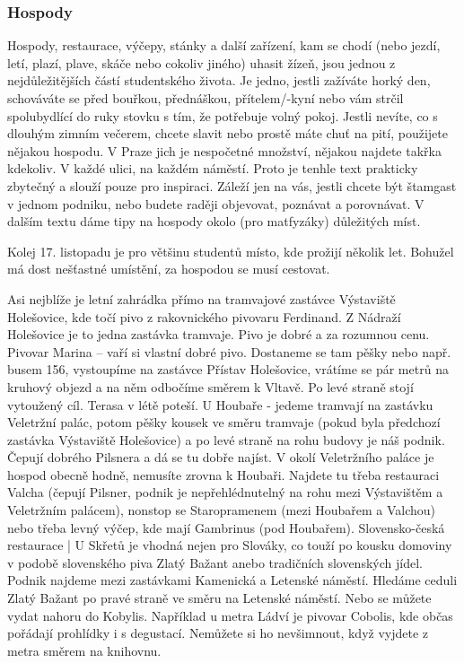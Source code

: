 \subsubsection{Hospody}
Hospody, restaurace, výčepy, stánky a další zařízení, kam se chodí (nebo jezdí, letí, plazí, plave, skáče nebo cokoliv jiného) uhasit žízeň, jsou jednou z nejdůležitějších částí studentského života. Je jedno, jestli zažíváte horký den, schováváte se před bouřkou, přednáškou, přítelem/-kyní nebo vám strčil spolubydlící do ruky stovku s tím, že potřebuje volný pokoj. Jestli nevíte, co s dlouhým zimním večerem, chcete slavit nebo prostě máte chuť na pití, použijete nějakou hospodu. V Praze jich je nespočetné množství, nějakou najdete takřka kdekoliv. V každé ulici, na každém náměstí. Proto je tenhle text prakticky zbytečný a slouží pouze pro inspiraci. Záleží jen na vás, jestli chcete být štamgast v jednom podniku, nebo budete raději objevovat, poznávat a porovnávat. V dalším textu dáme tipy na hospody okolo (pro matfyzáky) důležitých míst.

Kolej 17. listopadu je pro většinu studentů místo, kde prožijí několik let. Bohužel má dost nešťastné umístění, za hospodou se musí cestovat.

Asi nejblíže je letní zahrádka přímo na tramvajové zastávce Výstaviště Holešovice, kde točí pivo z rakovnického pivovaru Ferdinand. Z Nádraží Holešovice je to jedna zastávka tramvaje. Pivo je dobré a za rozumnou cenu.
Pivovar Marina – vaří si vlastní dobré pivo. Dostaneme se tam pěšky nebo např. busem 156, vystoupíme na zastávce Přístav Holešovice, vrátíme se pár metrů na kruhový objezd a na něm odbočíme směrem k Vltavě. Po levé straně stojí vytoužený cíl. Terasa v létě poteší.
U Houbaře - jedeme tramvají na zastávku Veletržní palác, potom pěšky kousek ve směru tramvaje (pokud byla předchozí zastávka Výstaviště Holešovice) a po levé straně na rohu budovy je náš podnik. Čepují dobrého Pilsnera a dá se tu dobře najíst. V okolí Veletržního paláce je hospod obecně hodně, nemusíte zrovna k Houbaři. Najdete tu třeba restauraci Valcha (čepují Pilsner, podnik je nepřehlédnutelný na rohu mezi Výstavištěm a Veletržním palácem), nonstop se Staropramenem (mezi Houbařem a Valchou) nebo třeba levný výčep, kde mají Gambrinus (pod Houbařem).
Slovensko-česká restaurace | U Skřetů je vhodná nejen pro Slováky, co touží po kousku domoviny v podobě slovenského piva Zlatý Bažant anebo tradičních slovenských jídel. Podnik najdeme mezi zastávkami Kamenická a Letenské náměstí. Hledáme ceduli Zlatý Bažant po pravé straně ve směru na Letenské náměstí.
Nebo se můžete vydat nahoru do Kobylis. Například u metra Ládví je pivovar Cobolis, kde občas pořádají prohlídky i s degustací. Nemůžete si ho nevšimnout, když vyjdete z metra směrem na knihovnu.

